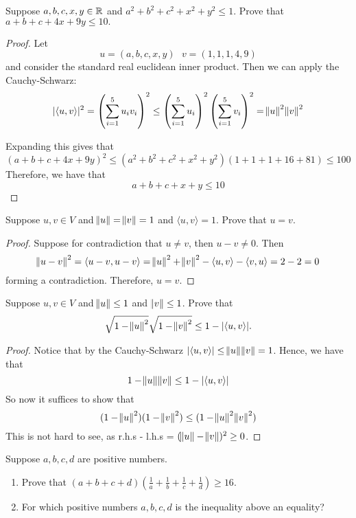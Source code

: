 \documentclass{extarticle}
\begin{document}
\begin{problem}{8}
    Suppose \(a,b,c,x,y \in \mathbb{R}\) and \(a^2 + b^2 + c^2 + x^2 + y^2 \leq 1\). Prove that 
    \(a + b + c + 4x + 9y \leq 10.\)
\end{problem}

\begin{proof}
Let 
\[u = (a, b, c, x, y) \ \ \ v = (1, 1, 1, 4, 9)\]
and consider the standard real euclidean inner product. Then we can apply the Cauchy-Schwarz:
\[|\langle u,v \rangle|^2 = \left(\sum_{i=1}^{5}u_i v_i \right)^2 \leq \left(\sum_{i=1}^{5} u_i\right)^2 \left(\sum_{i=1}^{5}v_i\right)^2 = \norm{u}^2 \norm{v}^2\]

Expanding this gives that 
\[(a + b + c + 4x + 9y)^2 \leq (a^2+b^2+c^2+x^2+y^2)(1+1+1+16+81) \leq 100\] 
Therefore, we have that 
\[a + b + c + x + y \leq 10\]
\end{proof}

\begin{problem}{9}
    Suppose \(u, v \in V\) and \(\norm{u} = \norm{v} = 1\) and \(\langle u,v \rangle = 1\). Prove 
    that \(u = v\).
\end{problem}

\begin{proof}
Suppose for contradiction that \(u \neq v\), then \(u - v \neq 0\). Then 
\[\norm{u - v}^2 = \langle u-v,u-v \rangle = \norm{u}^2 + \norm{v}^2 - \langle u,v \rangle 
- \langle v,u \rangle= 2 - 2 = 0\]
forming a contradiction. Therefore, \(u = v\).
\end{proof}

\begin{problem}{10}
    Suppose \(u, v \in V\) and \(\norm{u} \leq 1\) and \(\norm{v} \leq 1\). Prove that 
    \[\sqrt{1 - \norm{u}^2} \sqrt{1 - \norm{v}^2} \leq 1 - |\langle u,v \rangle|.\]
\end{problem}

\begin{proof}
Notice that by the Cauchy-Schwarz \( |\langle u,v \rangle| \leq \norm{u}\norm{v} = 1\). Hence, we have that 
\[1 - \norm{u} \norm{v} \leq 1 - |\langle u,v \rangle|\]
So now it suffices to show that 
\[(1 - \norm{u}^2)(1 - \norm{v}^2) \leq (1 - \norm{u}^2 \norm{v}^2)\]
This is not hard to see, as r.h.s - l.h.s = \((\norm{u} - \norm{v})^2 \geq 0\).
\end{proof}

\begin{problem}{12}
    Suppose \(a,b,c,d\) are positive numbers. 
    \begin{enumerate}[label=(\alph*)]
        \item Prove that \((a+b+c+d)(\frac{1}{a} + \frac{1}{b} + \frac{1}{c} + \frac{1}{d}) \geq 16\). 
        \item For which positive numbers \(a,b,c,d\) is the inequality above an equality?
    \end{enumerate}
\end{problem}
\end{document}
